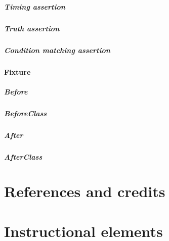 \documentclass[english, usepdftitle=false, svgnames, color="table, fixpdftex, hyperref, fixinclude, xcdraw", t]{beamer}
\begin{document}
\subsubsection{Timing assertion}


\subsubsection{Truth assertion}


\subsubsection{Condition matching assertion}



\subsection{Fixture}


\subsubsection{Before}


\subsubsection{BeforeClass}


\subsubsection{After}


\subsubsection{AfterClass}




\backmatter{}
\part{References and credits}



\part{Instructional elements}


\end{document}
